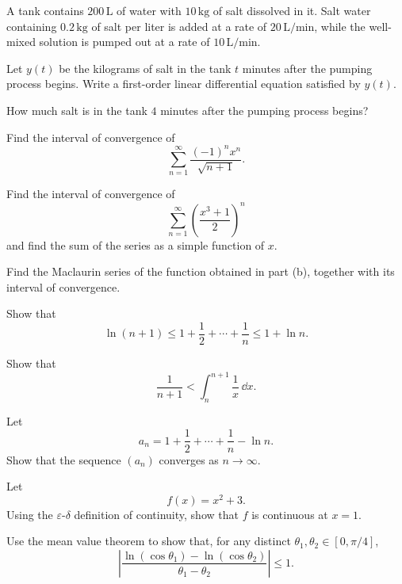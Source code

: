 \begin{problem}
A tank contains $200\,\mathrm{L}$ of water with $10\,\mathrm{kg}$ of salt dissolved in it. Salt water containing $0.2\,\mathrm{kg}$ of salt per liter is added at a rate of $20\,\mathrm{L/min}$, while the well-mixed solution is pumped out at a rate of $10\,\mathrm{L/min}$.
\begin{problemsubparts}
\item Let $y(t)$ be the kilograms of salt in the tank $t$ minutes after the pumping process begins. Write a first-order linear differential equation satisfied by $y(t)$.
\item How much salt is in the tank $4$ minutes after the pumping process begins?
\end{problemsubparts}
\end{problem}

\begin{problem}
\begin{problemsubparts}
\item Find the interval of convergence of
\[
\sum_{n=1}^{\infty}\frac{(-1)^n x^n}{\sqrt{n+1}}.
\]
\item Find the interval of convergence of
\[
\sum_{n=1}^{\infty}\left(\frac{x^3+1}{2}\right)^n
\]
and find the sum of the series as a simple function of $x$.
\item Find the Maclaurin series of the function obtained in part \textup{(b)}, together with its interval of convergence.
\end{problemsubparts}
\end{problem}

\begin{problem}
\begin{problemsubparts}
\item Show that
\[
\ln(n+1)
\le
1+\frac12+\cdots+\frac1n
\le
1+\ln n.
\]
\item Show that
\[
\frac1{n+1}<\int_n^{n+1}\frac1x\,\dd x.
\]
\item Let
\[
a_n=1+\frac12+\cdots+\frac1n-\ln n.
\]
Show that the sequence $(a_n)$ converges as $n\to\infty$.
\end{problemsubparts}
\end{problem}

\begin{problem}
\begin{problemsubparts}
\item Let
\[
f(x)=x^2+3.
\]
Using the $\varepsilon$-$\delta$ definition of continuity, show that $f$ is continuous at $x=1$.
\item Use the mean value theorem to show that, for any distinct $\theta_1, \theta_2\in[0, \pi/4]$,
\[
\left|
\frac{\ln(\cos\theta_1)-\ln(\cos\theta_2)}{\theta_1-\theta_2}
\right|
\le1.
\]
\end{problemsubparts}
\end{problem}

